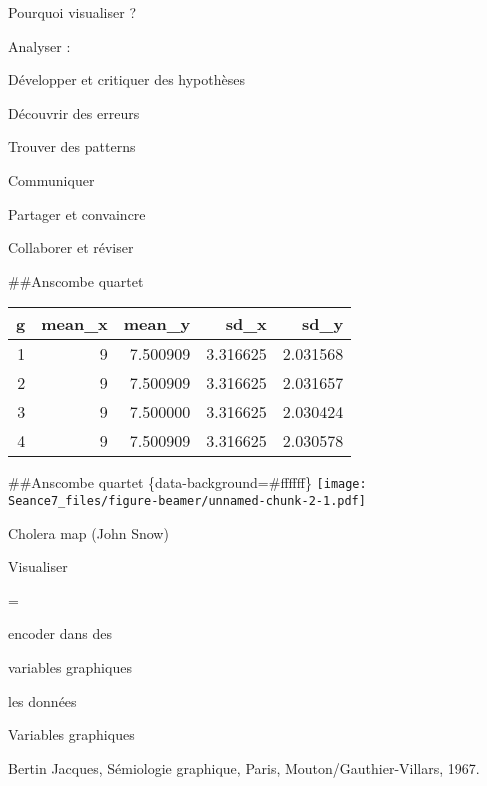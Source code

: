 \documentclass[ignorenonframetext,]{beamer}
\begin{document}
\begin{frame}{Pourquoi visualiser ?}
\protect\hypertarget{pourquoi-visualiser-1}{}

\begin{block}{Analyser :}

Développer et critiquer des hypothèses

Découvrir des erreurs

Trouver des patterns

\end{block}

\begin{block}{Communiquer}

Partager et convaincre

Collaborer et réviser

\#\#{Anscombe quartet}

\begin{longtable}[]{@{}rrrrr@{}}
\toprule
g & mean\_x & mean\_y & sd\_x & sd\_y\tabularnewline
\midrule
\endhead
1 & 9 & 7.500909 & 3.316625 & 2.031568\tabularnewline
2 & 9 & 7.500909 & 3.316625 & 2.031657\tabularnewline
3 & 9 & 7.500000 & 3.316625 & 2.030424\tabularnewline
4 & 9 & 7.500909 & 3.316625 & 2.030578\tabularnewline
\bottomrule
\end{longtable}

\#\#{Anscombe quartet} \{data-background=\#ffffff\}
\texttt{[image: Seance7\_files/figure-beamer/unnamed-chunk-2-1.pdf]}

\end{block}

\end{frame}

\begin{frame}{Cholera map (John Snow)}
\protect\hypertarget{cholera-map-john-snow}{}

\end{frame}

\begin{frame}{}
\protect\hypertarget{section}{}

{ Visualiser }

=

encoder dans des

{ variables graphiques}

les données

\end{frame}

\begin{frame}{{Variables graphiques}}
\protect\hypertarget{variables-graphiques}{}

Bertin Jacques, Sémiologie graphique, Paris, Mouton/Gauthier-Villars,
1967.

\end{frame}
\end{document}
